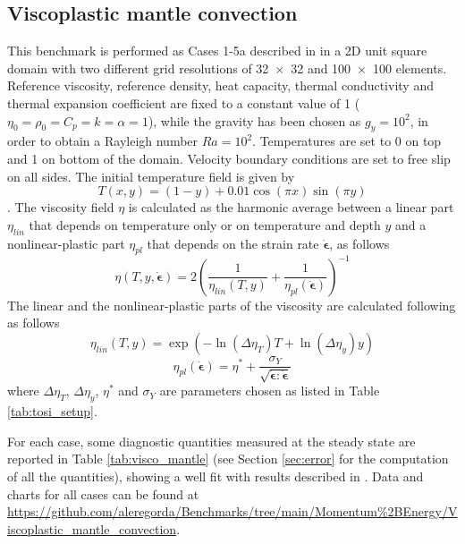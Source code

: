 \documentclass[hidelinks,10pt,a4paper]{article}
\begin{document}
\subsection{Viscoplastic mantle convection}\label{sec:visco_mantle}
This benchmark is performed as Cases 1-5a described in \citet{Tosi2015} in a 2D unit square domain with two different grid resolutions of \num{32x32} 
and \num{100x100} elements. Reference viscosity, reference density, heat capacity, thermal conductivity and thermal expansion coefficient are fixed to a constant
value of 1 ($\eta_0= \rho_0= C_p = k=\alpha=1$), while the gravity has been chosen as $g_y=10^2$, in order to obtain a Rayleigh number $Ra=10^2$. Temperatures
are set to 0 on top and 1 on bottom of the domain. Velocity boundary conditions are set to free slip on all sides. The initial temperature field is given by
\[T(x,y)=(1-y)+0.01 \cos (\pi x) \sin (\pi y)\].
The viscosity field $\eta$ is calculated as the harmonic average between a linear part $\eta_{lin}$ that depends on temperature only or on temperature and 
depth $y$ and a nonlinear-plastic part $\eta_{pl}$ that depends on the strain rate $\dot{\bm{\epsilon}}$, as follows
\[\eta(T,y,\dot{\bm{\epsilon}})=2\left(\frac{1}{\eta_{lin}(T,y)}+\frac{1}{\eta_{pl}(\dot{\bm{\epsilon}})}\right)^{-1}\]
The linear and the nonlinear-plastic parts of the viscosity are calculated following \citet{Tosi2015} as follows
\[\eta_{lin}(T,y)=\exp(-\ln(\Delta\eta_T)T+\ln(\Delta\eta_y)y)\]
\[\eta_{pl}(\dot{\bm{\epsilon}})=\eta^*+\frac{\sigma_Y}{\sqrt{\dot{\bm{\epsilon}}:\dot{\bm{\epsilon}}}}\]
where $\Delta\eta_T$, $\Delta\eta_y$, $\eta^*$ and $\sigma_Y$ are parameters chosen as listed in Table \ref{tab:tosi_setup}.

For each case, some diagnostic quantities measured at the steady state are reported in Table \ref{tab:visco_mantle} (see Section \ref{sec:error} for 
the computation of all the quantities), showing a well fit with results described in \citet{Tosi2015}. Data and charts for all cases can be found at 
\url{https://github.com/aleregorda/Benchmarks/tree/main/Momentum%2BEnergy/Viscoplastic_mantle_convection}.
\end{document}
